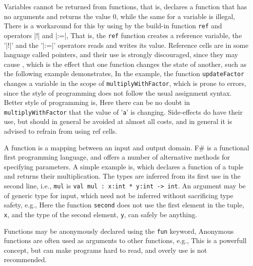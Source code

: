 Variables cannot be returned from functions, that is,
%
%
declares a function that has no arguments and returns the value 0, while the same for a variable is illegal,
%
%
There is a workaround for this by using  by the build-in function \texttt{ref} and operators \token|!| and \token|:=|,
%
%
That is, the \texttt{ref} function creates a reference variable, the '\token|!|' and the '\token|:=|' operators reads and writes its value. Reference cells are in some language called pointers, and their use is strongly discouraged, since they may cause , which is the effect that one function changes the state of another, such as the following example demonstrates,
%
%
In the example, the function \texttt{updateFactor} changes a variable in the scope of \texttt{multiplyWithFactor}, which is prone to errors, since the style of programming does not follow the usual assignment syntax. Better style of programming is,
%
%
Here there can be no doubt in \texttt{multiplyWithFactor} that the value of '\texttt{a}' is changing. Side-effects do have their use, but should in general be avoided at almost all costs, and in general it is advised to refrain from using ref cells.














A function is a mapping between an input and output domain. F\# is a functional first programming language, and offers a number of alternative methods for specifying parameters. A simple example is,
which declares a function of a tuple and returns their multiplication. The types are inferred from its first use in the second line, i.e., \texttt{mul} is \texttt{val mul : x:int * y:int -> int}.  An argument may be of generic type for input, which need not be inferred without sacrificing type safety, e.g.,
Here the function \texttt{second} does not use the first element in the tuple, \texttt{x}, and the type of the second element, \texttt{y}, can safely be anything.

Functions may be anonymously declared using the \texttt{fun} keyword,
Anonymous functions are often used as arguments to other functions, e.g.,
This is a powerfull concept, but can make programs hard to read, and overly use is not recommended.

